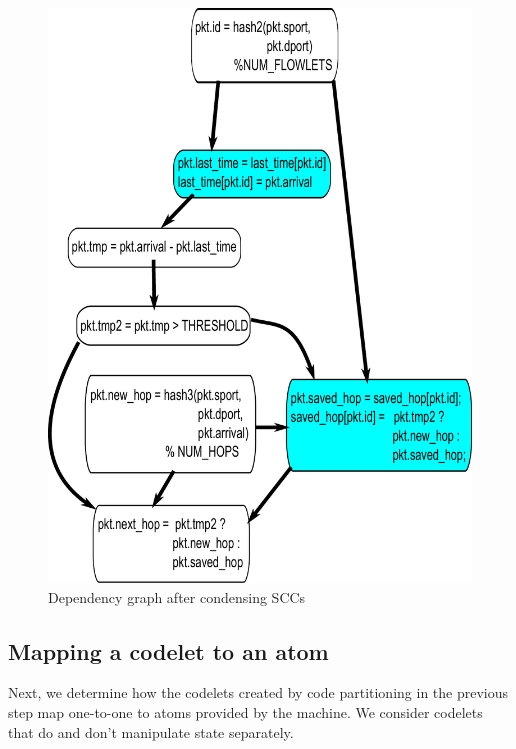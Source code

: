 \begin{figure}[!t]
\begin{minipage}{0.5\textwidth}
\includegraphics[width=\columnwidth]{scc.pdf}
\caption{Dependency graph after condensing SCCs}
\label{fig:partitioning_after}
\end{minipage}
\end{figure}

\subsection{Mapping a codelet to an atom}
\label{ss:code_gen}
Next, we determine how the codelets created by code partitioning in the
previous step map one-to-one to atoms provided by the \absmachine machine. We
consider codelets that do and don't manipulate state separately.

